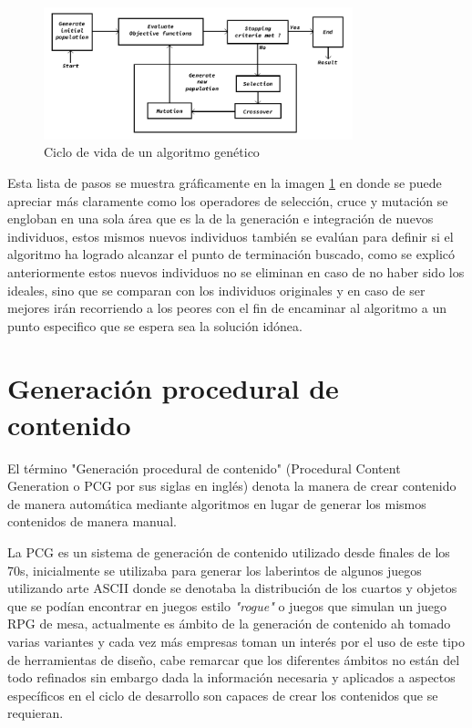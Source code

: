 \begin{figure}
    \centering
    \includegraphics[width=0.8\textwidth]{img/ga_life_cycle.png}
    \caption{Ciclo de vida de un algoritmo genético}
    \label{figure:GA-Cycle}
\end{figure}

Esta lista de pasos se muestra gráficamente en la imagen \ref{figure:GA-Cycle} en
donde se puede apreciar más claramente como los operadores de selección, cruce y
mutación se engloban en una sola área que es la de la generación e integración
de nuevos individuos, estos mismos nuevos individuos también se evalúan para
definir si el algoritmo ha logrado alcanzar el punto de terminación buscado, como
se explicó anteriormente estos nuevos individuos no se eliminan en caso de no
haber sido los ideales, sino que se comparan con los individuos originales y en
caso de ser mejores irán recorriendo a los peores con el fin de encaminar al
algoritmo a un punto especifico que se espera sea la solución idónea.

\section{Generación procedural de contenido}
\label{section:PCG}

El término "Generación procedural de contenido" (Procedural Content Generation o
PCG por sus siglas en inglés) denota la manera de crear contenido de manera
automática mediante algoritmos en lugar de generar los mismos contenidos de
manera manual.

La PCG es un sistema de generación de contenido utilizado desde finales de los
70s, inicialmente se utilizaba para generar los laberintos de algunos juegos
utilizando arte ASCII donde se denotaba la distribución de los cuartos y objetos
que se podían encontrar en juegos estilo \textit{"rogue"} o juegos que simulan
un juego RPG de mesa, actualmente es ámbito de la generación de contenido ah
tomado varias variantes y cada vez más empresas toman un interés por el uso de
este tipo de herramientas de diseño, cabe remarcar que los diferentes ámbitos no
están del todo refinados sin embargo dada la información necesaria y aplicados a
aspectos específicos en el ciclo de desarrollo son capaces de crear los
contenidos que se requieran.

